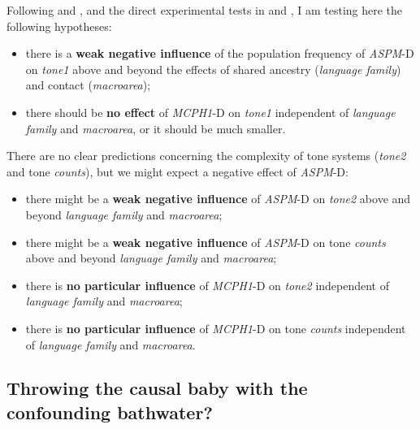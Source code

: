 \documentclass[twoside,onecolumn]{article}
\begin{document}
Following \citet{dediu_ladd_2007} and \citet{ladd_bioling_2008}, and the direct experimental tests in \citet{wong_plosone_2012} and \citet{wong_sciadv_2020}, I am testing here the following hypotheses:

\begin{itemize}
  \item there is a \textbf{weak negative influence} of the population frequency of \textit{ASPM}-D on \textit{tone1} above and beyond the effects of shared ancestry (\textit{language family}) and contact (\textit{macroarea});
  \item there should be \textbf{no effect} of \textit{MCPH1}-D on \textit{tone1} independent of \textit{language family} and \textit{macroarea}, or it should be much smaller.
\end{itemize}

There are no clear predictions concerning the complexity of tone systems (\textit{tone2} and tone \textit{counts}), but we might expect a negative effect of \textit{ASPM}-D:

\begin{itemize}
  \item there might be a \textbf{weak negative influence} of \textit{ASPM}-D on \textit{tone2} above and beyond \textit{language family} and \textit{macroarea};
  \item there might be a \textbf{weak negative influence} of \textit{ASPM}-D on tone \textit{counts} above and beyond \textit{language family} and \textit{macroarea};
  \item there is \textbf{no particular influence} of \textit{MCPH1}-D on \textit{tone2} independent of \textit{language family} and \textit{macroarea};
  \item there is \textbf{no particular influence} of \textit{MCPH1}-D on tone \textit{counts} independent of \textit{language family} and \textit{macroarea}.
\end{itemize}


\subsection{Throwing the causal baby with the confounding bathwater?}
\end{document}
